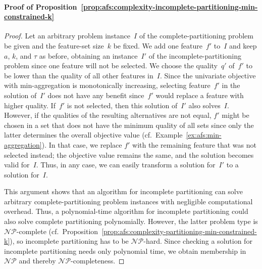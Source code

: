 \documentclass{article}
\theoremstyle{definition}
\begin{document}
\paragraph{Proof of Proposition~\ref{prop:afs:complexity-incomplete-partitioning-min-constrained-k}}
%
\begin{proof}
Let an arbitrary problem instance~$I$ of the complete-partitioning problem be given and the feature-set size~$k$ be fixed.
We add one feature~$f'$ to~$I$ and keep $a$, $k$, and $\tau$ as before, obtaining an instance~$I'$ of the incomplete-partitioning problem since one feature will not be selected.
We choose the quality~$q'$ of~$f'$ to be lower than the quality of all other features in~$I$.
Since the univariate objective with min-aggregation is monotonically increasing, selecting feature~$f'$ in the solution of~$I'$ does not have any benefit since~$f'$ would replace a feature with higher quality.
If~$f'$ is not selected, then this solution of~$I'$ also solves~$I$.
However, if the qualities of the resulting alternatives are not equal, $f'$ might be chosen in a set that does not have the minimum quality of all sets since only the latter determines the overall objective value (cf.~Example~\ref{ex:afs:min-aggregation}).
In that case, we replace $f'$ with the remaining feature that was not selected instead; the objective value remains the same, and the solution becomes valid for~$I$.
Thus, in any case, we can easily transform a solution for~$I'$ to a solution for~$I$.
	
This argument shows that an algorithm for incomplete partitioning can solve arbitrary complete-partitioning problem instances with negligible computational overhead.
Thus, a polynomial-time algorithm for incomplete partitioning could also solve complete partitioning polynomially.
However, the latter problem type is $\mathcal{NP}$-complete (cf.~Proposition~\ref{prop:afs:complexity-partitioning-min-constrained-k}), so incomplete partitioning has to be $\mathcal{NP}$-hard.
Since checking a solution for incomplete partitioning needs only polynomial time, we obtain membership in $\mathcal{NP}$ and thereby $\mathcal{NP}$-completeness.
\end{proof}
\end{document}
